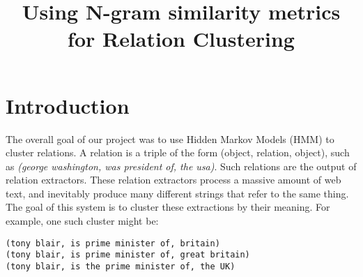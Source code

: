 \documentclass{article}
\begin{document}
\sloppy

\def\x{{\mathbf x}}
\def\L{{\cal L}}


\title{Using N-gram similarity metrics for Relation Clustering}
%

\address{
\textit{mayhewsw@rose-hulman.edu}\\
\textit{kampernj@rose-hulman.edu}\\
Rose-Hulman Institute of Technology}


\maketitle
\thispagestyle{fancy} \fancyhead{} \lhead{}
 \cfoot{}
\renewcommand{\headrulewidth}{0pt}
\renewcommand{\footrulewidth}{0pt}


%
%
%
\section{Introduction}
\label{sec:intro}

The overall goal of our project was to use Hidden Markov Models (HMM) to cluster relations. A relation is a triple of the form (object, relation, object), such as \textit{(george washington, was president of, the usa)}. Such relations are the output of relation extractors. These relation extractors process a massive amount of web text, and inevitably produce many different strings that refer to the same thing. The goal of this system is to cluster these extractions by their meaning. For example, one such cluster might be:

\begin{verbatim}
(tony blair, is prime minister of, britain) 
(tony blair, is prime minister of, great britain) 
(tony blair, is the prime minister of, the UK)
\end{verbatim}
\end{document}
